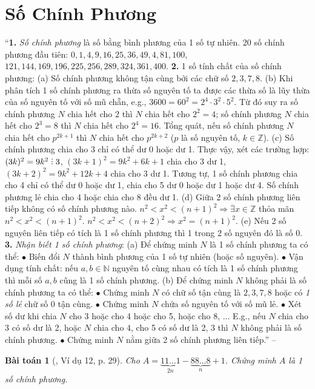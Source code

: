 \documentclass{article}
\numberwithin{equation}{section}
\newtheorem{baitoan}{Bài toán}
\DeclareRobustCommand{\divby}{%
	\mathrel{\vbox{\baselineskip.65ex\lineskiplimit0pt\hbox{.}\hbox{.}\hbox{.}}}%
}
\begin{document}
\section{Số Chính Phương}
``\textbf{1.} \textit{Số chính phương} là số bằng bình phương của 1 số tự nhiên. 20 số chính phương đầu tiên: $0,1,4,9,16,25,36,49,4,81,100$, $121,144,169,196,225,256,289,324,361,400$. \textbf{2.} 1 số tính chất của số chính phương: (a) Số chính phương không tận cùng bởi các chữ số $2,3,7,8$. (b) Khi phân tích 1 số chính phương ra thừa số nguyên tố ta được các thừa số là lũy thừa của số nguyên tố với số mũ chẵn, e.g., $3600 = 60^2 = 2^4\cdot3^2\cdot5^2$. Từ đó suy ra số chính phương $N$ chia hết cho 2 thì $N$ chia hết cho $2^2 = 4$; số chính phương $N$ chia hết cho $2^3 = 8$ thì $N$ chia hết cho $2^4 = 16$. Tổng quát, nếu số chính phương $N$ chia hết cho $p^{2k+1}$ thì $N$ chia hết cho $p^{2k+2}$ ($p$ là số nguyên tố, $k\in\mathbb{Z}$). (c) Số chính phương chia cho 3 chỉ có thể dư 0 hoặc dư 1. Thực vậy, xét các trường hợp: $(3k)^2 = 9k^2\divby3$, $(3k + 1)^2 = 9k^2 + 6k + 1$ chia cho 3 dư 1, $(3k + 2)^2 = 9k^2 + 12k + 4$ chia cho 3 dư 1. Tương tự, 1 số chính phương chia cho 4 chỉ có thể dư 0 hoặc dư 1, chia cho 5 dư 0 hoặc dư 1 hoặc dư 4. Số chính phương lẻ chia cho 4 hoặc chia cho 8 đều dư 1. (d) Giữa 2 số chính phương liên tiếp không có số chính phương nào. $n^2 < x^2 < (n + 1)^2\Rightarrow\overline{\exists}x\in\mathbb{Z}$ thỏa mãn $n^2 < x^2 < (n + 1)^2$. $n^2 < x^2 < (n + 2)^2\Rightarrow x^2 = (n + 1)^2$. (e) Nếu 2 số nguyên liên tiếp có tích là 1 số chính phương thì 1 trong 2 số nguyên đó là số 0. \textbf{3.} \textit{Nhận biết 1 số chính phương}: (a) Để chứng minh $N$ là 1 số chính phương ta có thể: $\bullet$ Biến đổi $N$ thành bình phương của 1 số tự nhiên (hoặc số nguyên). $\bullet$ Vận dụng tính chất: nếu $a,b\in\mathbb{N}$ nguyên tố cùng nhau có tích là 1 số chính phương thì mỗi số $a,b$ cũng là 1 số chính phương. (b) Để chứng minh $N$ không phải là số chính phương ta có thể: $\bullet$ Chứng minh $N$ có chữ số tận cùng là $2,3,7,8$ hoặc có \textit{1 số lẻ} chữ số 0 tận cùng. $\bullet$ Chứng minh $N$ chứa số nguyên tố với số mũ lẻ. $\bullet$ Xét số dư khi chia $N$ cho 3 hoặc cho 4 hoặc cho 5, hoặc cho 8, $\ldots$ E.g., nếu $N$ chia cho 3 có số dư là 2, hoặc $N$ chia cho 4, cho 5 có số dư là 2, 3 thì $N$ không phải là số chính phương. $\bullet$ Chứng minh $N$ nằm giữa 2 số chính phương liên tiếp.'' -- \cite[pp. 28--29]{Tuyen_Toan_8}

\begin{baitoan}[\cite{Tuyen_Toan_8}, Ví dụ 12, p. 29]
	Cho $A = \underbrace{11\ldots1}_{2n} - \underbrace{88\ldots8}_n + 1$. Chứng minh $A$ là 1 số chính phương.
\end{baitoan}
\end{document}
